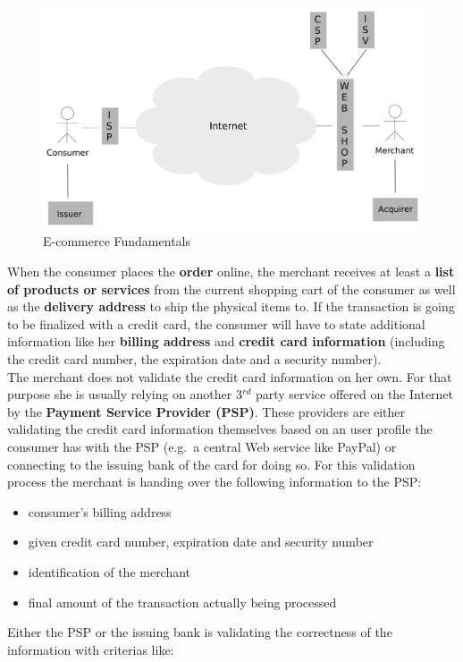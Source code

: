 \begin{figure}[H]
	\centering
		\includegraphics[width=0.8\columnwidth]{images/e-commerce-scenario.pdf}
	\caption{E-commerce Fundamentals}
\label{fig:images_ecommerce_scenario}
\end{figure}

When the consumer places the \textbf{order} online, the merchant receives at least a \textbf{list of products or services} from the current shopping cart of the consumer as well as the \textbf{delivery address} to ship the physical items to. If the transaction is going to be finalized with a credit card, the consumer will have to state additional information like her \textbf{billing address} and \textbf{credit card information} (including the credit card number, the expiration date and a security number). \\
The merchant does not validate the credit card information on her own. For that purpose she is usually relying on another 3$^{rd}$ party service offered on the Internet by the \textbf{Payment Service Provider (\gls{PSP})}. These providers are either validating the credit card information themselves based on an user profile the consumer has with the PSP (e.g.\ a central Web service like PayPal) or connecting to the issuing bank of the card for doing so. For this validation process the merchant is handing over the following information to the PSP:\@

\begin{itemize}
    \item consumer's billing address
    \item given credit card number, expiration date and security number
    \item identification of the merchant
    \item final amount of the transaction actually being processed
\end{itemize}

Either the PSP or the issuing bank is validating the correctness of the information with criterias like: \@

